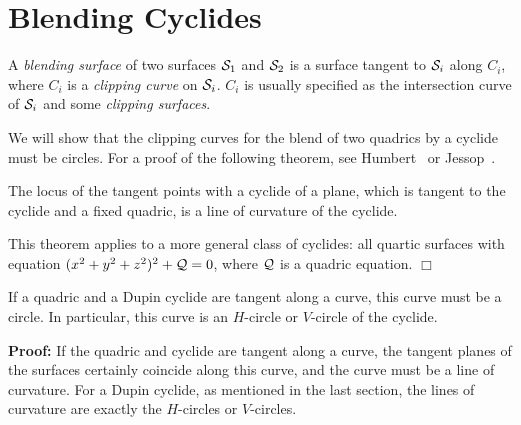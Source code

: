 \section{Blending Cyclides}
\label{section:interpolating}

\begin{definition}
     A {\em blending surface} of two surfaces
${\cal S}_1$ and ${\cal S}_2$ is a surface tangent to ${\cal S}_i$ along
$C_i$, where $C_i$ is a {\em clipping curve} on
${\cal S}_i$.   $C_i$ is usually specified as the intersection curve of 
${\cal S}_i$ and some {\em clipping surfaces}.
\end{definition}

     We will show that the clipping curves for the blend of two quadrics by a
cyclide must be circles.  For a proof of the following theorem, see 
Humbert~\cite{humbert:1885} or Jessop~\cite{jessop:1916}.

\begin{theorem}[Humbert 1885]
\label{thm:humbert-thm}
     The locus of the tangent points with a cyclide of a plane, which is 
tangent to the cyclide and a fixed quadric, is a line of curvature of the
cyclide.
\end{theorem}

\begin{remark} \rm
     This theorem applies to a more general class of cyclides: all
quartic surfaces with equation $(x^2+y^2+z^2)^2+{\cal Q}=0$, 
where ${\cal Q}$ is a quadric equation.  $\Box$
\end{remark}

\begin{corollary}
\label{cor:humbert}
     If a quadric and a Dupin cyclide are tangent along a curve, this
curve must be a circle.  In particular, this curve is an $H$-circle or 
$V$-circle of the cyclide.
\end{corollary}
{\bf Proof:}  If the quadric and cyclide are tangent along a curve, the tangent
planes of the surfaces certainly coincide along this curve, and the curve must
be a line of curvature.  For a Dupin cyclide, as mentioned in the last section,
the lines of curvature are exactly the $H$-circles or $V$-circles. \QED


